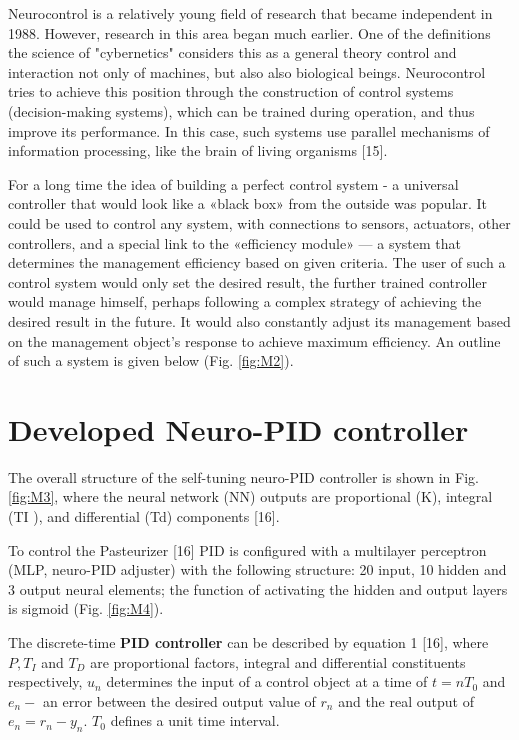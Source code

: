 \documentclass[10pt, a4paper]{proc}
\begin{document}
{Neurocontrol is a relatively young field of research
that became independent in 1988. However, research
in this area began much earlier. One of the definitions
the science of "cybernetics" considers this as a general
theory control and interaction not only of machines, but
also also biological beings. Neurocontrol tries to achieve
this position through the construction of control systems
(decision-making systems), which can be trained during
operation, and thus improve its performance. In this case,
such systems use parallel mechanisms of information
processing, like the brain of living organisms [15].
\par For a long time the idea of building a perfect control
system - a universal controller that would look like a
«black box» from the outside was popular. It could be
used to control any system, with connections to sensors,
actuators, other controllers, and a special link to the
«efficiency module» — a system that determines the
management efficiency based on given criteria. The user
of such a control system would only set the desired result,
the further trained controller would manage himself,
perhaps following a complex strategy of achieving the
desired result in the future. It would also constantly
adjust its management based on the management object’s
response to achieve maximum efficiency. An outline of
such a system is given below (Fig. \ref{fig:M2}).

 \section{\normalsize{Developed Neuro-PID controller}}

The overall structure of the self-tuning neuro-PID
controller is shown in Fig. \ref{fig:M3}, where the neural network
(NN) outputs are proportional (K), integral (TI ), and
differential (Td) components [16].
\par To control the Pasteurizer [16] PID is configured with
a multilayer perceptron (MLP, neuro-PID adjuster) with
the following structure: 20 input, 10 hidden and 3 output
neural elements; the function of activating the hidden
and output layers is sigmoid (Fig. \ref{fig:M4}).
\par The discrete-time \textbf{PID controller} can be described by
equation 1 [16], where $P, T_{I}$ and $T_{D}$ are proportional factors, integral and differential constituents respectively, $u_{n}$ determines the input of a control object at a time of $t=n T_{0}$ and $e_{n}-$ an error between the desired output value of $r_{n}$ and the real output of $e_{n}=r_{n}-y_{n}$. $T_{0}$ defines a unit time interval.

}
\end{document}
